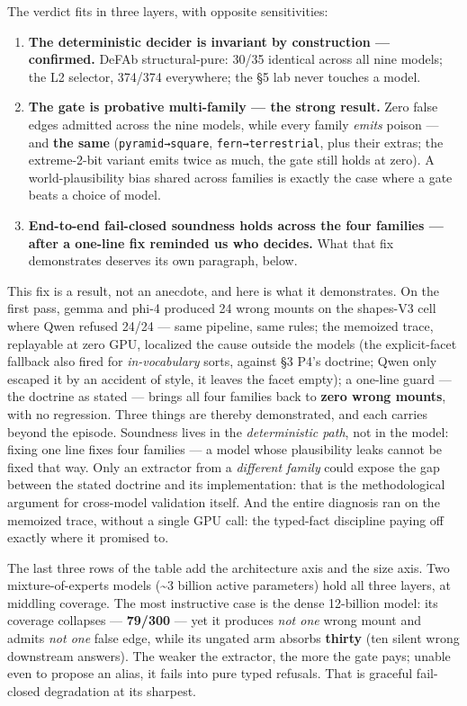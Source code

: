 \documentclass[11pt]{article}
\begin{document}
The verdict fits in three layers, with opposite sensitivities:

\begin{enumerate}
\item \textbf{The deterministic decider is invariant by construction — confirmed.} DeFAb structural-pure: 30/35 identical across all nine models; the L2 selector, 374/374 everywhere; the §5 lab never touches a model.
\item \textbf{The gate is probative multi-family — the strong result.} Zero false edges admitted across the nine models, while every family \emph{emits} poison — and \textbf{the same} (\texttt{pyramid→square}, \texttt{fern→terrestrial}, plus their extras; the extreme-2-bit variant emits twice as much, the gate still holds at zero). A world-plausibility bias shared across families is exactly the case where a gate beats a choice of model.
\item \textbf{End-to-end fail-closed soundness holds across the four families — after a one-line fix reminded us who decides.} What that fix demonstrates deserves its own paragraph, below.
\end{enumerate}

This fix is a result, not an anecdote, and here is what it demonstrates. On the first pass, gemma and phi-4 produced 24 wrong mounts on the shapes-V3 cell where Qwen refused 24/24 — same pipeline, same rules; the memoized trace, replayable at zero GPU, localized the cause outside the models (the explicit-facet fallback also fired for \emph{in-vocabulary} sorts, against §3 P4's doctrine; Qwen only escaped it by an accident of style, it leaves the facet empty); a one-line guard — the doctrine as stated — brings all four families back to \textbf{zero wrong mounts}, with no regression. Three things are thereby demonstrated, and each carries beyond the episode. Soundness lives in the \emph{deterministic path}, not in the model: fixing one line fixes four families — a model whose plausibility leaks cannot be fixed that way. Only an extractor from a \emph{different family} could expose the gap between the stated doctrine and its implementation: that is the methodological argument for cross-model validation itself. And the entire diagnosis ran on the memoized trace, without a single GPU call: the typed-fact discipline paying off exactly where it promised to.

The last three rows of the table add the architecture axis and the size axis. Two mixture-of-experts models (\textasciitilde{}3 billion active parameters) hold all three layers, at middling coverage. The most instructive case is the dense 12-billion model: its coverage collapses — \textbf{79/300} — yet it produces \emph{not one} wrong mount and admits \emph{not one} false edge, while its ungated arm absorbs \textbf{thirty} (ten silent wrong downstream answers). The weaker the extractor, the more the gate pays; unable even to propose an alias, it fails into pure typed refusals. That is graceful fail-closed degradation at its sharpest.
\end{document}
